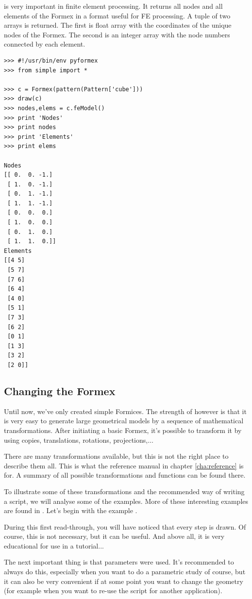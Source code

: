  is very important in finite element processing. It returns all nodes and all elements of the Formex in a format useful for FE processing. A tuple of two arrays is returned. The first is float array with the coordinates of the unique nodes of the Formex. The second is an integer array with the node numbers connected by each element.
\begin{verbatim}
>>> #!/usr/bin/env pyformex
>>> from simple import *

>>> c = Formex(pattern(Pattern['cube']))
>>> draw(c)
>>> nodes,elems = c.feModel()
>>> print 'Nodes'
>>> print nodes
>>> print 'Elements'
>>> print elems

Nodes
[[ 0.  0. -1.]
 [ 1.  0. -1.]
 [ 0.  1. -1.]
 [ 1.  1. -1.]
 [ 0.  0.  0.]
 [ 1.  0.  0.]
 [ 0.  1.  0.]
 [ 1.  1.  0.]]
Elements
[[4 5]
 [5 7]
 [7 6]
 [6 4]
 [4 0]
 [5 1]
 [7 3]
 [6 2]
 [0 1]
 [1 3]
 [3 2]
 [2 0]]
\end{verbatim}

\subsection{Changing the Formex}
\label{subsec:changing}
Until now, we've only created simple Formices. The strength of \pyformex however is that it is very easy to generate large geometrical models by a sequence of mathematical transformations. After initiating a basic Formex, it's possible to transform it by using copies, translations, rotations, projections,...

There are many transformations available, but this is not the right place to describe them all. This is what the reference manual in chapter \ref{cha:reference} is for. A summary of all possible transformations and functions can be found there.

To illustrate some of these transformations and the recommended way of writing a script, we will analyse some of the examples. More of these interesting examples are found in . Let's begin with the example . 



During this first read-through, you will have noticed that every step is drawn. Of course, this is not necessary, but it can be useful. And above all, it is very educational for use in a tutorial...

The next important thing is that parameters were used. It's recommended to always do this, especially when you want to do a parametric study of course, but it can also be very convenient if at some point you want to change the geometry (for example when you want to re-use the script for another application).

